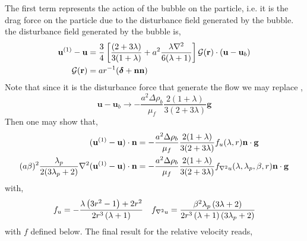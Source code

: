 \documentclass[12pt]{My_preprint}
\begin{document}
The first term represents the action of the bubble on the particle, i.e. it is the drag force on the particle due to the disturbance field generated by the bubble.
the disturbance field generated by the bubble is, 
\begin{align*}
    \textbf{u}^{(1)} - \textbf{u}
    &=
    \frac{3}{4}\left[
        \frac{(2+3\lambda)}{3(1+\lambda)}
        + 
        a^2\frac{\lambda\mathbf{\nabla}^2}{6(\lambda+1)}
        \right]\mathcal{G}(\textbf{r})\cdot
    (\textbf{u}- \textbf{u}_b)\\
    \mathcal{G}(\textbf{r})
    &=
    a r^{-1}(\bm\delta + \textbf{nn})
\end{align*}
Note that since it is the disturbance force that generate the flow we may replace 
,
\begin{equation}
    \textbf{u}-\textbf{u}_b \to - \frac{a^2 \Delta \rho_b}{\mu_f}
    \frac{2(1+\lambda)}{3(2+3\lambda)}\textbf{g}
\end{equation}
Then one may show that, 
\begin{align}
    (\textbf{u}^{(1)} - \textbf{u})\cdot\textbf{n} &= 
    - \frac{a^2 \Delta \rho_b}{\mu_f}
    \frac{2(1+\lambda)}{3(2+3\lambda)}
    f_u(\lambda,r) \textbf{n}\cdot \textbf{g}\\
    (a\beta)^2 \frac{\lambda_p}{2(3\lambda_p +2)} \mathbf{\nabla}^2 (\textbf{u}^{(1)} - \textbf{u})\cdot \textbf{n}
    &=
    - \frac{a^2 \Delta \rho_b}{\mu_f}
    \frac{2(1+\lambda)}{3(2+3\lambda)}
    f_{\mathbf{\nabla}^2 u}(\lambda,\lambda_p,\beta,r) \textbf{n}\cdot \textbf{g}
\end{align}
with,
\begin{align}
    f_u = - \frac{\lambda \left(3 r^{2} - 1\right) + 2 r^{2}}{2 r^{3} \left(\lambda + 1\right)}
    &&
    f_{\mathbf{\nabla}^2 u } 
    =
    \frac{\beta^{2} \lambda_{p} \left(3 \lambda + 2\right)}{2 r^{3} \left(\lambda + 1\right) \left(3 \lambda_{p} + 2\right)}
\end{align}
with $f$ defined below. 
The final result for the relative velocity reads, 
\end{document}
